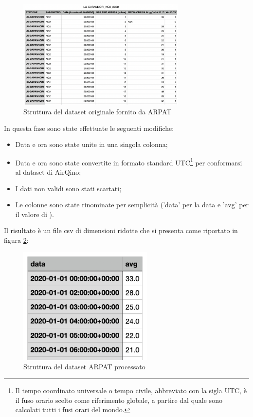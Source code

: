 \begin{figure}[H]
\centering
\captionsetup{justification=centering}
\includegraphics[width=0.75\textwidth,height=\textheight,keepaspectratio]{img/dataset_arpat_no2_prima.png}
\caption{Struttura del dataset originale  fornito da ARPAT}
\label{fig:ds-arpat}
\end{figure}

In questa fase sono state effettuate le seguenti modifiche:
\begin{itemize}
  \item Data e ora sono state unite in una singola colonna;
  \item Data e ora sono state convertite in formato standard UTC\footnote{Il tempo coordinato universale o tempo civile, abbreviato con la sigla UTC, è il fuso orario scelto come riferimento globale, a partire dal quale sono calcolati tutti i fusi orari del mondo.} per conformarsi al dataset di AirQino;
  \item I dati non validi sono stati scartati;
  \item Le colonne sono state rinominate per semplicità ('data' per la data e 'avg' per il valore di ).
\end{itemize}

Il risultato è un file csv di dimensioni ridotte che si presenta come riportato in figura \ref{fig:ds-arpat-dopo}:

\begin{figure}[H]
\centering
\captionsetup{justification=centering}
\includegraphics[width=0.60\textwidth,height=\textheight,keepaspectratio]{img/dataset_arpat_no2_dopo.png}
\caption{Struttura del dataset ARPAT  processato}
\label{fig:ds-arpat-dopo}
\end{figure}
\clearpage

